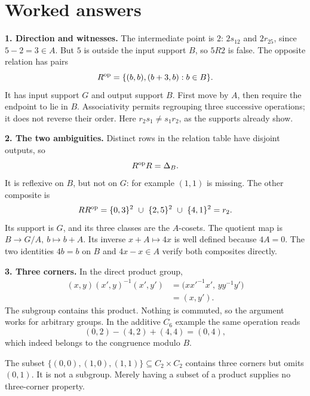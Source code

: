 
\clearpage
\section{Worked answers}\label{c:answers}
\textbf{1. Direction and witnesses.}
The intermediate point is \(2\): \(2s_12\) and \(2r_25\), since
\(5-2=3\in A\). But \(5\) is outside the input support \(B\), so \(5R2\)
is false. The opposite relation has pairs
\[
 R^{\mathrm{op}}=\{(b,b),(b+3,b):b\in B\}.
\]
It has input support \(G\) and output support \(B\). First move by \(A\),
then require the endpoint to lie in \(B\).
Associativity permits regrouping three successive operations; it does
not reverse their order. Here \(r_2s_1\ne s_1r_2\), as the supports
already show.

\medskip
\textbf{2. The two ambiguities.}
Distinct rows in the relation table have disjoint outputs, so
\[
 R^{\mathrm{op}} R=\Delta_B.
\]
It is reflexive on \(B\), but not on \(G\): for example \((1,1)\) is
missing. The other composite is
\[
 RR^{\mathrm{op}}=
 \{0,3\}^2\ \cup\ \{2,5\}^2\ \cup\ \{4,1\}^2=r_2.
\]
Its support is \(G\), and its three classes are the \(A\)-cosets.
The quotient map is \(B\to G/A,\ b\mapsto b+A\).
Its inverse \(x+A\mapsto4x\) is well defined because \(4A=0\).
The two identities \(4b=b\) on \(B\) and \(4x-x\in A\) verify both
composites directly.

\medskip
\textbf{3. Three corners.}
In the direct product group,
\[
\begin{split}
 (x,y)(x',y)^{-1}(x',y')
 &=\bigl(xx'^{-1}x',\,yy^{-1}y'\bigr)\\
 &=(x,y').
\end{split}
\]
The subgroup contains this product. Nothing is commuted, so the argument
works for arbitrary groups. In the additive \(C_6\) example the same
operation reads
\[
 (0,2)-(4,2)+(4,4)=(0,4),
\]
which indeed belongs to the congruence modulo \(B\).

The subset
\(\{(0,0),(1,0),(1,1)\}\subseteq C_2\times C_2\)
contains three corners but omits \((0,1)\).
It is not a subgroup. Merely having a subset of a product supplies no
three-corner property.


